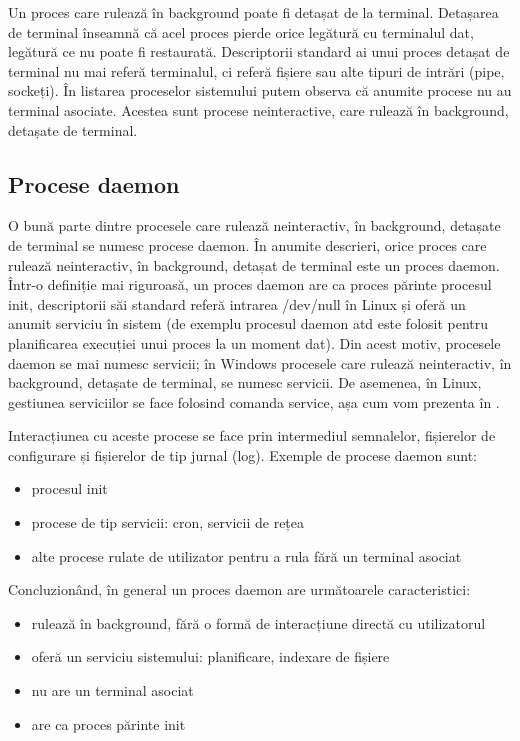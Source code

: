 Un proces care rulează în background poate fi detașat de la terminal. Detașarea
de terminal înseamnă că acel proces pierde orice legătură cu terminalul dat,
legătură ce nu poate fi restaurată. Descriptorii standard ai unui proces detașat
de terminal nu mai referă terminalul, ci referă fișiere sau alte tipuri de
intrări (pipe, sockeți). În listarea proceselor sistemului putem observa că
anumite procese nu au terminal asociate. Acestea sunt procese neinteractive,
care rulează în background, detașate de terminal.

\subsection{Procese daemon}
\label{sec:procese-interactivitate-daemon}

O bună parte dintre procesele care rulează neinteractiv, în background, detașate
de terminal se numesc procese daemon. În anumite descrieri, orice proces care
rulează neinteractiv, în background, detașat de terminal este un proces daemon.
Într-o definiție mai riguroasă, un proces daemon are ca proces părinte procesul
init, descriptorii săi standard referă intrarea /dev/null în Linux și oferă un
anumit serviciu în sistem (de exemplu procesul daemon atd este folosit pentru
planificarea execuției unui proces la un moment dat). Din acest motiv, procesele
daemon se mai numesc servicii; în Windows procesele care rulează neinteractiv,
în background, detașate de terminal, se numesc servicii. De asemenea, în Linux,
gestiunea serviciilor se face folosind comanda service, așa cum vom prezenta în
.

Interacțiunea cu aceste procese se face prin intermediul semnalelor, fișierelor
de configurare și fișierelor de tip jurnal (log). Exemple de procese daemon
sunt:

\begin{itemize}
	\item procesul init
	\item procese de tip servicii: cron, servicii de rețea
	\item alte procese rulate de utilizator pentru a rula fără un terminal
		asociat
\end{itemize}

Concluzionând, în general un proces daemon are următoarele caracteristici:

\begin{itemize}
	\item rulează în background, fără o formă de interacțiune directă cu
		utilizatorul
	\item oferă un serviciu sistemului: planificare, indexare de fișiere
	\item nu are un terminal asociat
	\item are ca proces părinte init
\end{itemize}

